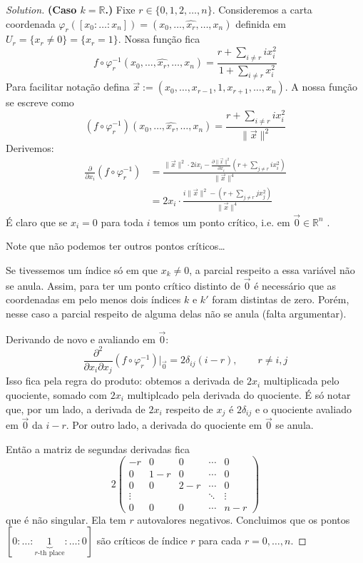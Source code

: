\begin{proof}[Solution]\leavevmode
	\textbf{(Caso \(k=\mathbb{R}\).)} Fixe \(r \in \{0,1,2,\ldots,n\}\). Consideremos a carta coordenada \(\varphi_r([x_0:\ldots:x_n])	= (x_0,\ldots,\widehat{x_r},\ldots,x_n)\) definida em \(U_r=\{x_r \neq 0\}=\{x_r=1\}\). Nossa função fica
	\[f \circ \varphi_r^{-1}(x_0,\ldots,\widehat{x_r},\ldots,x_n)=\frac{r+\sum_{i\neq r}ix_i^2}{1+\sum_{i\neq r}x_i^2}\]
Para facilitar notação defina \(\vec{x}:=(x_0,\ldots,x_{r-1},1,x_{r+1},\ldots,x_n)\). A nossa função se escreve como
\[(f \circ \varphi_r^{-1})(x_0,\ldots,\widehat{x_r},\ldots,x_n)=\frac{r+\sum_{i\neq r}ix_i^2}{\|\vec{x}\|^2}\]
Derivemos:
\begin{align*}
\frac{\partial }{\partial x_i}(f \circ \varphi_r^{-1})&=\frac{\|\vec{x}\|^2\cdot 2ix_i-\frac{\partial \|\vec{x}\|^2}{\partial x_i}\left(r+\sum_{j \neq r}ix_i^2\right) }{\|\vec{x}\|^4}\\
&=2x_i\cdot  \frac{i \|\vec{x}\|^2-\left(r+\sum_{j \neq r}jx_j^2\right) }{\|\vec{x}\|^4}
\end{align*}
É claro que se \(x_i=0\) para toda \(i\) temos um ponto crítico, i.e. em \(\vec{0}\in \mathbb{R}^n\)%
.

Note que não podemos ter outros pontos críticos…

Se tivessemos um índice só em que \(x_k \neq 0\), a parcial respeito a essa variável não se anula. Assim, para ter um ponto crítico distinto de \(\vec{0}\) é necessário que as coordenadas em pelo menos dois índices \(k\) e \(k'\) foram distintas de zero. Porém, nesse caso a parcial respeito de alguma delas não se anula (falta argumentar).

Derivando de novo e avaliando em \(\vec{0}\):
\[\frac{\partial ^2}{\partial x_i\partial x_j}(f \circ \varphi_r^{-1})\Big|_{\vec{0}}=2\delta_{ij}(i-r),\qquad r \neq  i,j\]
Isso fica pela regra do produto: obtemos a derivada de \(2x_i\) multiplicada pelo quociente, somado com \(2x_i\) multiplcado pela derivada do quociente. É só notar que, por um lado, a derivada de \(2x_i\) respeito de \(x_j\) é \(2\delta_{ij}\) e o quociente avaliado em \(\vec{0}\) da \(i-r\). Por outro lado, a derivada do quociente em \(\vec{0}\) se anula.

Então a matriz de segundas derivadas fica
\[2\begin{pmatrix} -r & 0 &0 & \cdots &0\\
0 & 1-r & 0& \cdots & 0\\
0 & 0 & 2-r & \cdots & 0\\
\vdots & & &\ddots &\vdots \\
0 & 0 & 0 & \cdots & n-r\end{pmatrix}\]
que é não singular. Ela tem \(r\) autovalores negativos. Concluimos que os pontos \([0:\ldots:\underbrace{1}_{r\text{-th place} }:\ldots:0]\) são críticos de índice \(r\) para cada \(r=0,\ldots,n\).


\end{proof}
